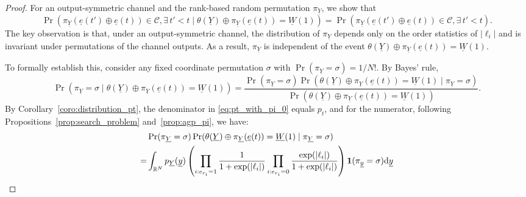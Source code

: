 \documentclass[letterpaper,draftclsnofoot,onecolumn]{IEEEtran}
\begin{document}
\begin{proof}
    
    For an output-symmetric channel and the rank-based random permutation $\pi_{\underline{Y}}$, we show that
    \begin{equation}
        \Pr(\pi_{\underline{Y}}(\underline{e}(t') \oplus \underline{e}(t)) \in \mathcal{C},\exists\, t'< t \mid \theta(\underline{Y})\oplus \pi_{\underline{Y}}(\underline{e}(t))=\underline{W}(1)) = \Pr(\pi_{\underline{Y}}(\underline{e}(t') \oplus \underline{e}(t)) \in \mathcal{C},\exists\, t'< t).
    \end{equation}
    The key observation is that, under an output-symmetric channel, the distribution of $\pi_{\underline{Y}}$ depends only on the order statistics of $|\ell_i|$ and is invariant under permutations of the channel outputs. As a result, $\pi_{\underline{Y}}$ is independent of the event $\theta(\underline{Y})\oplus \pi_{\underline{Y}}(\underline{e}(t))=\underline{W}(1)$.

    To formally establish this, consider any fixed coordinate permutation $\sigma$ with $\Pr(\pi_{\underline{Y}}=\sigma)=1/N!$. By Bayes' rule,
    \begin{equation}\label{eq:pt_with_pi_0}
         \Pr(\pi_{\underline{Y}} = \sigma \mid \theta(\underline{Y})\oplus \pi_{\underline{Y}}(\underline{e}(t))=\underline{W}(1)) = \frac{ \Pr(\pi_{\underline{Y}} = \sigma) \Pr(\theta(\underline{Y})\oplus \pi_{\underline{Y}}(\underline{e}(t))=\underline{W}(1) \mid \pi_{\underline{Y}} = \sigma)}{\Pr(\theta(\underline{Y})\oplus \pi_{\underline{Y}}(\underline{e}(t))=\underline{W}(1))}.
    \end{equation}
    By Corollary~\ref{coro:distribution_pt}, the denominator in \eqref{eq:pt_with_pi_0} equals $p_t$, and for the numerator, following Propositions~\ref{prop:search_problem} and~\ref{prop:agp_pi}, we have:
    \begin{align}
        & \Pr(\pi_{\underline{Y}} = \sigma) \Pr(\theta(\underline{Y})\oplus \pi_{\underline{Y}}(\underline{e}(t))=\underline{W}(1) \mid \pi_{\underline{Y}} = \sigma) \notag \\
        =  & \int_{\mathbb{R}^N}p_{\underline{Y}}(\underline{y})\left(\prod_{i:e_{r_i} = 1 } \frac{1}{1+\exp(|\ell_i|)} \prod_{i:e_{r_i} = 0} \frac{\exp(|\ell_i|)} {1+\exp(|\ell_i|)}\right)\mathbf{1}(\pi_{\underline{y}}= \sigma)\mathrm{d}\underline{y}\label{eq:pt_with_pi_1}
    \end{align}
    

\end{proof}
\end{document}
